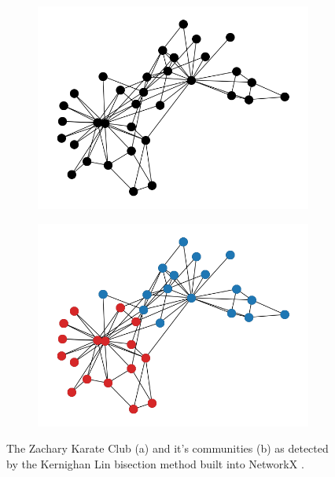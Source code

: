 \begin{figure}
    \begin{center}
        \begin{subfigure}[b]{0.45\textwidth}
            \includegraphics[width=\textwidth]{img/3/zachary_no_comm}
            \caption{}
            \label{fig:zachary_no_communities}
        \end{subfigure}
        \begin{subfigure}[b]{0.45\textwidth}
            \includegraphics[width=\textwidth]{img/3/zachary_comm}
            \caption{}
            \label{fig:zachary_communities}
        \end{subfigure}
    \end{center}
    \caption{The Zachary Karate Club (a) and it's communities (b) as detected by the Kernighan Lin bisection method \cite{6771089} built into NetworkX \cite{SciPyProceedings_11}.}
    \label{fig:zachary_partitioned}
\end{figure}


